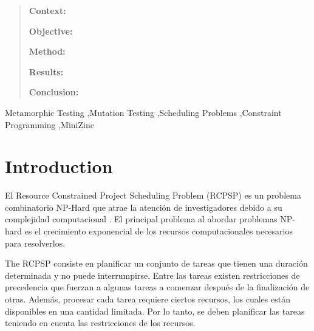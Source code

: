 \begin{frontmatter}






\begin{abstract}

  \textbf{Context:}

  \textbf{Objective:}

  \textbf{Method:}

  \textbf{Results:}

  \textbf{Conclusion:}

\end{abstract}


\begin{keyword}
 Metamorphic Testing \sep Mutation Testing \sep Scheduling Problems \sep Constraint Programming \sep MiniZinc
\end{keyword}

\end{frontmatter}

\section{Introduction}
El Resource Constrained Project Scheduling Problem (RCPSP)  es un problema combinatorio NP-Hard que atrae la atención de investigadores  debido a su complejidad computacional \cite{herroelen1998resource, abdolshah2014review,hartmann2022updated}. El principal problema al abordar problemas NP-hard es el crecimiento exponencial de los recursos computacionales necesarios para resolverlos.


The RCPSP consiste en planificar un conjunto de tareas que tienen una duración determinada y no puede interrumpirse.
Entre las tareas existen restricciones de precedencia que fuerzan a algunas tareas a comenzar después de la finalización de otras.
Además, procesar cada tarea requiere ciertos recursos, los cuales están disponibles en una cantidad limitada. Por lo tanto, se deben planificar las tareas teniendo en cuenta las restricciones de los recursos.


